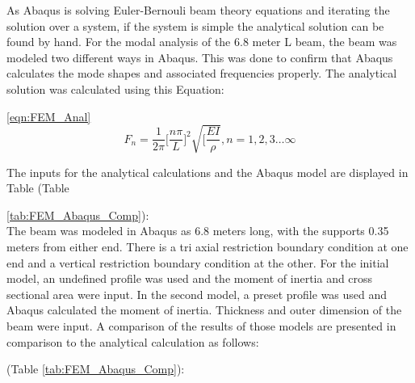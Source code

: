 As Abaqus is solving Euler-Bernouli beam theory equations and iterating the solution over a system, if the system is simple the analytical solution can be found by hand. For the modal analysis of the 6.8 meter L beam, the beam was modeled two different ways in Abaqus. This was done to confirm that Abaqus calculates the mode shapes and associated frequencies properly. The analytical solution was calculated using this Equation:

\ref{eqn:FEM_Anal}\\

\begin{equation}

F_{n}=\frac{1}{2\pi}\biggl[\frac{n \pi}{L} \biggr]^{2}\sqrt{[\frac{EI}{\rho}} , n=1,2,3\dots\infty

\label{eqn:FEM_Anal}

\end{equation}

\noindent The inputs for the analytical calculations and the Abaqus model are displayed in Table (Table 

\ref{tab:FEM_Abaqus_Comp}):\\

\indent The beam was modeled in Abaqus as 6.8 meters long, with the supports 0.35 meters from either end. There is a tri axial restriction boundary condition at one end and a vertical restriction boundary condition at the other. For the initial model, an undefined profile was used and the moment of inertia and cross sectional area were input. In the second model, a preset profile was used and Abaqus calculated the moment of inertia. Thickness and outer dimension of the beam were input. A comparison of the results of those models are presented in comparison to the analytical calculation as follows:

(Table \ref{tab:FEM_Abaqus_Comp}):\\

